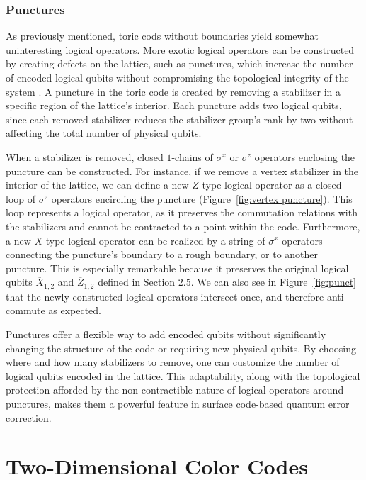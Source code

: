 \documentclass[12pt]{article}
\theoremstyle{definition}
\begin{document}
\subsubsection{Punctures}
As previously mentioned, toric cods without boundaries yield somewhat uninteresting logical operators. More exotic logical operators can be constructed by creating defects on the lattice, such as punctures, which increase the number of encoded logical qubits without compromising the topological integrity of the system \cite{brown2017}. A puncture in the toric code is created by removing a stabilizer in a specific region of the lattice’s interior. Each puncture adds two logical qubits, since each removed stabilizer reduces the stabilizer group’s rank by two without affecting the total number of physical qubits.\newline

When a stabilizer is removed, closed $1$-chains of $\sigma^x$ or $\sigma^z$ operators enclosing the puncture can be constructed. For instance, if we remove a vertex stabilizer in the interior of the lattice, we can define a new $Z$-type logical operator as a closed loop of $\sigma^z$ operators encircling the puncture (Figure~\ref{fig:vertex puncture}). This loop represents a logical operator, as it preserves the commutation relations with the stabilizers and cannot be contracted to a point within the code. Furthermore, a new $X$-type logical operator can be realized by a string of $\sigma^x$ operators connecting the puncture’s boundary to a rough boundary, or to another puncture. This is especially remarkable because it preserves the original logical qubits $\overline{X}_{1,2}$ and $\overline{Z}_{1,2}$ defined in Section $2.5$. We can also see in Figure~\ref{fig:punct} that the newly constructed logical operators intersect once, and therefore anti-commute as expected. \newline

Punctures offer a flexible way to add encoded qubits without significantly changing the structure of the code or requiring new physical qubits. By choosing where and how many stabilizers to remove, one can customize the number of logical qubits encoded in the lattice. This adaptability, along with the topological protection afforded by the non-contractible nature of logical operators around punctures, makes them a powerful feature in surface code-based quantum error correction.\newpage

\section{Two-Dimensional Color Codes}
\end{document}
